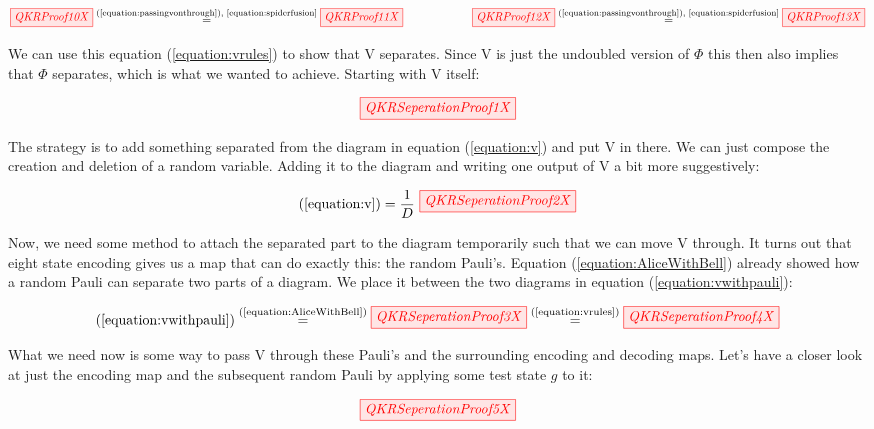 \documentclass[]{article}
\newcommand{\equaltext}[1]{\ensuremath{\stackrel{\text{#1}}{=}}}
\begin{document}
\begin{equation}
\label{equation:vrules}
	\tikzfig{QKRProof10X} \equaltext{(\ref{equation:passingvonthrough}), \ref{equation:spiderfusion}} \tikzfig{QKRProof11X} ~~~~~~~~~~~~~~~~~~ \tikzfig{QKRProof12X} \equaltext{(\ref{equation:passingvonthrough}), \ref{equation:spiderfusion}} \tikzfig{QKRProof13X}
\end{equation}

We can use this equation (\ref{equation:vrules}) to show that V separates. Since V is just the undoubled version of $\Phi$ this then also implies that $\Phi$ separates, which is what we wanted to achieve. Starting with V itself:

\begin{equation}
	\label{equation:v}
	\tikzfig{QKRSeperationProof1X}
\end{equation}

The strategy is to add something separated from the diagram in equation (\ref{equation:v}) and put V in there. We can just compose the creation and deletion of a random variable. Adding it to the diagram and writing one output of V a bit more suggestively:

\begin{equation}
	\label{equation:vwithpauli}
	(\ref{equation:v}) = \frac{1}{D}~
	\tikzfig{QKRSeperationProof2X}
\end{equation}

Now, we need some method to attach the separated part to the diagram temporarily such that we can move V through. It turns out that eight state encoding gives us a map that can do exactly this: the random Pauli's. Equation (\ref{equation:AliceWithBell}) already showed how a random Pauli can separate two parts of a diagram. We place it between the two diagrams in equation (\ref{equation:vwithpauli}):

\begin{equation}
\label{equation:movevthrough}
(\ref{equation:vwithpauli}) \equaltext{(\ref{equation:AliceWithBell})} \tikzfig{QKRSeperationProof3X} \equaltext{(\ref{equation:vrules})} \tikzfig{QKRSeperationProof4X}
\end{equation}

What we need now is some way to pass V through these Pauli's and the surrounding encoding and decoding maps. Let's have a closer look at just the encoding map and the subsequent random Pauli by applying some test state $g$ to it:

\begin{equation}
	\label{equation:RedSpiderRandomPauli}
	\tikzfig{QKRSeperationProof5X}
\end{equation}
\end{document}

